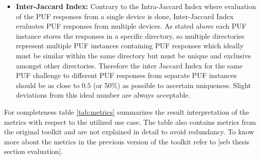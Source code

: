 \begin{itemize}
	\item \textbf{Inter-Jaccard Index:} Contrary to the Intra-Jaccard Index where evaluation of the PUF responses from a single device is done, Inter-Jaccard Index evaluates PUF responses from multiple devices. As stated above each PUF instance stores the responses in a specific directory, so multiple directories represent multiple PUF instances containing PUF responses which ideally must be similar within the same directory but must be unique and exclusive amongst other directories.
		Therefore the inter Jaccard Index for the same PUF challenge to different PUF responses from
		separate PUF instances should be as close to $0.5$ (or 50\%) as possible to ascertain
		uniqueness. Slight deviations from this ideal number are always acceptable.
\end{itemize}

For completeness table \ref{tab:metrics} summarizes the result interpretation of the metrics with respect to the utilized use case. The table also contains metrics from the original toolkit and are not explained in detail to avoid redundancy. To know more about the metrics in the previous version of the toolkit refer to [seb thesis section evaluation].\\

